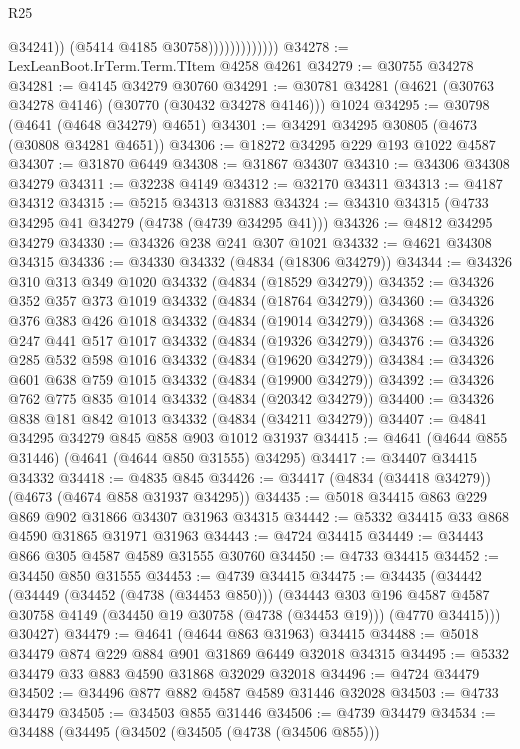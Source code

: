 \begin{lexlean}{R25}
\begin{coremodule}
                                @34241))
                            (@5414 @4185 @30758)))))))))))))
@34278 := LexLeanBoot.IrTerm.Term.TItem @4258 @4261
@34279 := @30755 @34278
@34281 := @4145 @34279 @30760
@34291 := @30781 @34281 (@4621 (@30763 @34278 @4146) (@30770 (@30432 @34278 @4146))) @1024
@34295 := @30798 (@4641 (@4648 @34279) @4651)
@34301 := @34291 @34295 @30805 (@4673 (@30808 @34281 @4651))
@34306 := @18272 @34295 @229 @193 @1022 @4587
@34307 := @31870 @6449
@34308 := @31867 @34307
@34310 := @34306 @34308 @34279
@34311 := @32238 @4149
@34312 := @32170 @34311
@34313 := @4187 @34312
@34315 := @5215 @34313 @31883
@34324 := @34310 @34315 (@4733 @34295 @41 @34279 (@4738 (@4739 @34295 @41)))
@34326 := @4812 @34295 @34279
@34330 := @34326 @238 @241 @307 @1021
@34332 := @4621 @34308 @34315
@34336 := @34330 @34332 (@4834 (@18306 @34279))
@34344 := @34326 @310 @313 @349 @1020 @34332 (@4834 (@18529 @34279))
@34352 := @34326 @352 @357 @373 @1019 @34332 (@4834 (@18764 @34279))
@34360 := @34326 @376 @383 @426 @1018 @34332 (@4834 (@19014 @34279))
@34368 := @34326 @247 @441 @517 @1017 @34332 (@4834 (@19326 @34279))
@34376 := @34326 @285 @532 @598 @1016 @34332 (@4834 (@19620 @34279))
@34384 := @34326 @601 @638 @759 @1015 @34332 (@4834 (@19900 @34279))
@34392 := @34326 @762 @775 @835 @1014 @34332 (@4834 (@20342 @34279))
@34400 := @34326 @838 @181 @842 @1013 @34332 (@4834 (@34211 @34279))
@34407 := @4841 @34295 @34279 @845 @858 @903 @1012 @31937
@34415 := @4641 (@4644 @855 @31446) (@4641 (@4644 @850 @31555) @34295)
@34417 := @34407 @34415 @34332
@34418 := @4835 @845
@34426 := @34417 (@4834 (@34418 @34279)) (@4673 (@4674 @858 @31937 @34295))
@34435 := @5018 @34415 @863 @229 @869 @902 @31866 @34307 @31963 @34315
@34442 := @5332 @34415 @33 @868 @4590 @31865 @31971 @31963
@34443 := @4724 @34415
@34449 := @34443 @866 @305 @4587 @4589 @31555 @30760
@34450 := @4733 @34415
@34452 := @34450 @850 @31555
@34453 := @4739 @34415
@34475 := @34435
    (@34442
      (@34449
        (@34452 (@4738 (@34453 @850)))
        (@34443
          @303
          @196
          @4587
          @4587
          @30758
          @4149
          (@34450 @19 @30758 (@4738 (@34453 @19)))
          (@4770 @34415)))
      @30427)
@34479 := @4641 (@4644 @863 @31963) @34415
@34488 := @5018 @34479 @874 @229 @884 @901 @31869 @6449 @32018 @34315
@34495 := @5332 @34479 @33 @883 @4590 @31868 @32029 @32018
@34496 := @4724 @34479
@34502 := @34496 @877 @882 @4587 @4589 @31446 @32028
@34503 := @4733 @34479
@34505 := @34503 @855 @31446
@34506 := @4739 @34479
@34534 := @34488
    (@34495
      (@34502
        (@34505 (@4738 (@34506 @855)))

\end{coremodule}
\end{lexlean}
